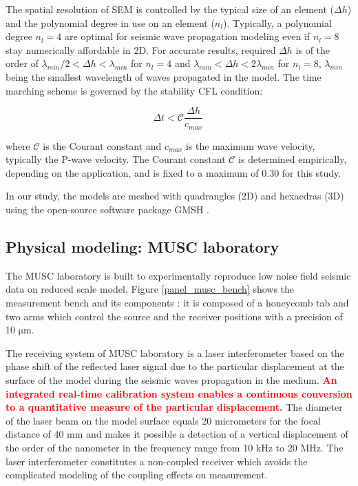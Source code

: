 \documentclass[manuscript,revised]{geophysics}
\newcommand{\correction}[1]{\textbf{\textcolor{red}{ #1}}}
\begin{document}
\noindent The spatial resolution of SEM is controlled by the typical size of an element ($\Delta h$) and the polynomial degree in use on an element ($n_{l}$). Typically, a polynomial degree $n_{l}=4$ are optimal for seismic wave propagation modeling \citep{moczo2011finite} even if $n_{l}=8$ stay numerically affordable in 2D. For accurate results, required $\Delta h$ is of the order of $\lambda_{min} /2 < \Delta h < \lambda_{min}$ for $n_{l}=4$ and $\lambda_{min} < \Delta h < 2\lambda_{min}$ for $n_{l}=8$, $\lambda_{min}$ being the smallest wavelength of waves propagated in the model. The time marching scheme is governed by the stability CFL condition:

\begin{equation}
	\Delta t < \mathcal{C}\frac{\Delta h}{c_{max}}\,   
\end{equation}

\noindent where $\mathcal{C}$ is the Courant constant and $c_{max}$ is the maximum wave velocity, typically the P-wave velocity. The Courant constant $\mathcal{C}$ is determined empirically, depending on the application, and is fixed to a maximum of 0.30 for this study.

\noindent In our study, the models are meshed with quadrangles (2D) and hexaedras (3D) using the open-source software package GMSH \citep{Geuzaine_MSH_2009}. 


\subsection{Physical modeling: MUSC laboratory}

\noindent The MUSC laboratory \citep{Bretaudeau_SSA_2008b,Bretaudeau_SSM_2011,Bretaudeau_FWI_2013} is built to experimentally reproduce low noise field seismic data on reduced scale model. Figure \ref{panel_musc_bench} shows the measurement bench and its components : it is composed of a honeycomb tab and two arms which control the source and the receiver positions with a precision of 10 $\mathrm{\mu m}$.

\noindent The receiving system of MUSC laboratory is a laser interferometer based on the phase shift of the reflected laser signal due to the particular displacement at the surface of the model during the seismic waves propagation in the medium. \correction{An integrated real-time calibration system enables a continuous conversion to a quantitative measure of the particular displacement.} The diameter of the laser beam on the model surface equals 20 micrometers for the focal distance of 40 mm and makes it possible a detection of a vertical displacement of the order of the nanometer in the frequency range from 10 kHz to 20 MHz. The laser interferometer constitutes a non-coupled receiver which avoids the complicated modeling of the coupling effects on measurement.
\end{document}
